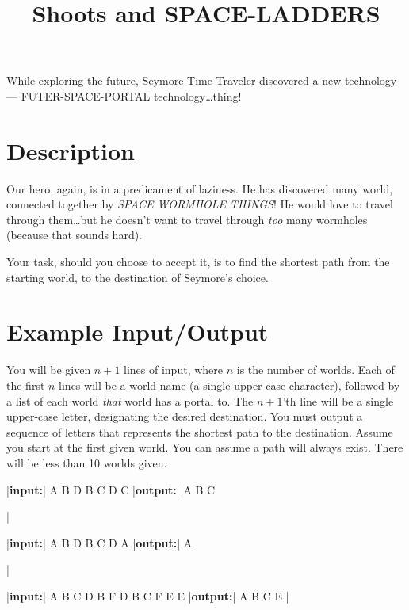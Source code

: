 \documentclass{../codeproblem}
\begin{document}
\title{Shoots and SPACE-LADDERS}

\begin{flavor}
  While exploring the future, Seymore Time Traveler discovered a new
  technology --- FUTER-SPACE-PORTAL technology\ldots thing!
\end{flavor}

\section*{Description}
Our hero, again, is in a predicament of laziness. He has discovered
many world, connected together by \emph{SPACE WORMHOLE THINGS}! He
would love to travel through them\ldots but he doesn't want to travel
through \emph{too} many wormholes (because that sounds hard).

Your task, should you choose to accept it, is to find the shortest
path from the starting world, to the destination of Seymore's choice.

\section*{Example Input/Output}

You will be given $n+1$ lines of input, where $n$ is the number of
worlds. Each of the first $n$ lines will be a world name (a single
upper-case character), followed by a list of each world \emph{that}
world has a portal to. The $n+1$'th line will be a single upper-case
letter, designating the desired destination. You must output a
sequence of letters that represents the shortest path to the
destination. Assume you start at the first given world. You can assume
a path will always exist. There will be less than 10 worlds given.


\begin{minipage}{.33\linewidth}
  \begin{example}
|\textbf{input:}|
A B D
B C D
C
|\textbf{output:}|
A B C


|\end{example}
\end{minipage}
\begin{minipage}{.33\linewidth}
\begin{example}
|\textbf{input:}|
A B D
B C D
A
|\textbf{output:}|
A


|\end{example}
\end{minipage}
\begin{minipage}{.33\linewidth}
\begin{example}
|\textbf{input:}|
A B C D
B F
D B C
F E
E
|\textbf{output:}|
A B C E
|\end{example}
\end{minipage}
\end{document}
